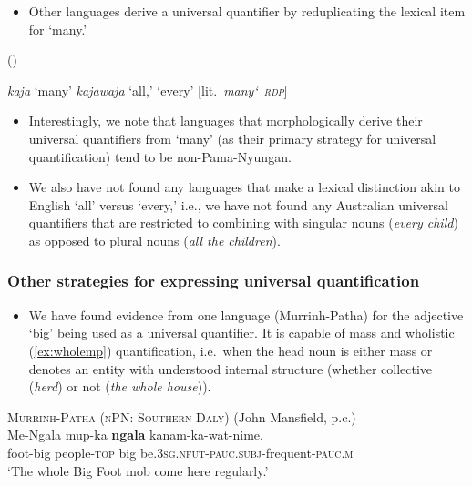\documentclass{article}
\begin{document}
\begin{itemize}
\item Other languages derive a universal quantifier by reduplicating the lexical item for `many.'
\end{itemize}

\newpage

\begin{exe}
   (\citealt[54]{mushin12})
  \begin{xlist}
    \ex \textit{kaja} `many'
    \ex \textit{kajawaja}  `all,' `every' [lit.\ \textit{many\char`~\textsc{rdp}}]
  \end{xlist}
\end{exe}


\begin{itemize}
\item Interestingly, we note that languages that morphologically derive their universal quantifiers from `many' (as their primary strategy for universal quantification) tend to be non-Pama-Nyungan.
\item We also have not found any languages that make a lexical distinction akin to English `all' versus `every,' i.e., we have not found any Australian universal quantifiers that are restricted to combining with singular nouns ({\it every child}) as opposed to plural nouns ({\it all the children}).
\end{itemize}

\subsubsection{Other strategies for expressing universal quantification
  \label{sec:uqbig}}

\begin{itemize}
\item We have found evidence from one language (Murrinh-Patha) for the adjective `big' being used as a universal quantifier. It is capable of mass and wholistic (\ref{ex:wholemp}) quantification, i.e.\ when the head noun is either mass or denotes an entity with understood internal structure (whether collective (\textit{herd}) or not (\textit{the whole house})).
\end{itemize}
\begin{exe}
  \ex\label{ex:wholemp} \textsc{Murrinh-Patha (nPN: Southern Daly)} (John Mansfield, p.c.)\\
  \gll Me-Ngala mup-ka     \textbf{ngala} kanam-ka-wat-nime.\\
  foot-big  people-\textsc{top} big  be.\textsc{3sg.nfut-pauc.subj}-frequent-\textsc{pauc.m}\\
  \glt `The whole Big Foot mob come here regularly.' %
\end{exe}
\end{document}
